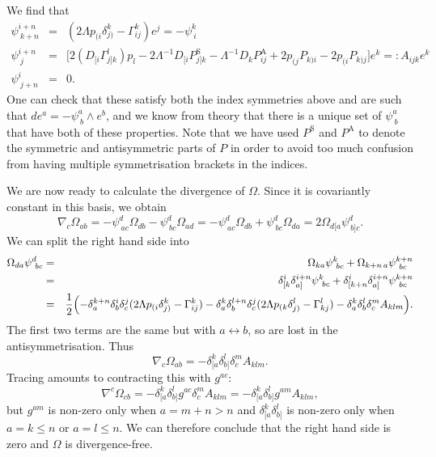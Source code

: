 We find that 
\begin{eqnarray*}
\psi_{\ k+n}^{i+n} & = & (2\Lambda p_{(i}\delta_{j)}^{k}-\Gamma_{ij}^{k})e^{j}=-\psi_{\ i}^{k}\\
\psi_{\ j}^{i+n} & = & \bigl[2(D_{[i}\Gamma_{j]k}^{l})p_{l}-2\Lambda^{-1}D_{[i}P_{j]k}^{\mathrm{S}}-\Lambda^{-1}D_{k}P_{ij}^{\mathrm{A}}+2p_{(j}P_{k)i}-2p_{(i}P_{k)j}\bigr]e^{k}=:A_{ijk}e^{k}\\
\psi_{\ j+n}^{i} & = & 0.
\end{eqnarray*}
One can check that these satisfy both the index symmetries above and
are such that $ de^{a}=-\psi_{\ b}^{a}\wedge e^{b}$, and
we know from theory that there is a unique set of $\psi_{\ b}^{a}$
that have both of these properties. Note that we have used $P^{\mathrm{S}}$
and $P^{\mathrm{A}}$ to denote the symmetric and antisymmetric parts
of $P$ in order to avoid too much confusion from having multiple
symmetrisation brackets in the indices.

We are now ready to calculate the divergence of $\Omega$. Since it
is covariantly constant in this basis, we obtain
\[
\nabla_{c}\Omega_{ab}=-\psi_{\ ac}^{d}\Omega_{db}-\psi_{\ bc}^{d}\Omega_{ad}=-\psi_{\ ac}^{d}\Omega_{db}+\psi_{\ bc}^{d}\Omega_{da}=2\Omega_{d[a}\psi_{\ b]c}^{d}.
\]
We can split the right hand side into
\begin{eqnarray*}
\Omega_{da}\psi_{\ bc}^{d} & = & \Omega_{ka}\psi_{\ bc}^{k}+\Omega_{k+n\, a}\psi_{\ bc}^{k+n}\\
 & = & \delta_{[k}^{i}\delta_{a]}^{i+n}\psi_{\ bc}^{k}+\delta_{[k+n}^{i}\delta_{a]}^{i+n}\psi_{\ bc}^{k+n}\\
 & = & \frac{1}{2}\Bigl(-\delta_{a}^{k+n}\delta_{b}^{i}\delta_{c}^{j}(2\Lambda p_{(i}\delta_{j)}^{k}-\Gamma_{ij}^{k})-\delta_{a}^{k}\delta_{b}^{l+n}\delta_{c}^{j}(2\Lambda p_{(k}\delta_{j)}^{l}-\Gamma_{kj}^{l})-\delta_{a}^{k}\delta_{b}^{l}\delta_{c}^{m}A_{klm}\Bigr).\\
\end{eqnarray*}
The first two terms are the same but with $a\leftrightarrow b$, so
are lost in the antisymmetrisation. Thus
\[
\nabla_{c}\Omega_{ab}=-\delta_{[a}^{k}\delta_{b]}^{l}\delta_{c}^{m}A_{klm}.
\]
Tracing amounts to contracting this with $g^{ac}$:
\[
\nabla^{c}\Omega_{cb}=-\delta_{[a}^{k}\delta_{b]}^{l}g^{ac}\delta_{c}^{m}A_{klm}=-\delta_{[a}^{k}\delta_{b]}^{l}g^{am}A_{klm},
\]
but $g^{am}$ is non-zero only when $a=m+n>n$ and $\delta_{[a}^{k}\delta_{b]}^{l}$
is non-zero only when $a=k\leq n$ or $a=l\leq n$. We can therefore
conclude that the right hand side is zero and $\Omega$ is divergence-free.


